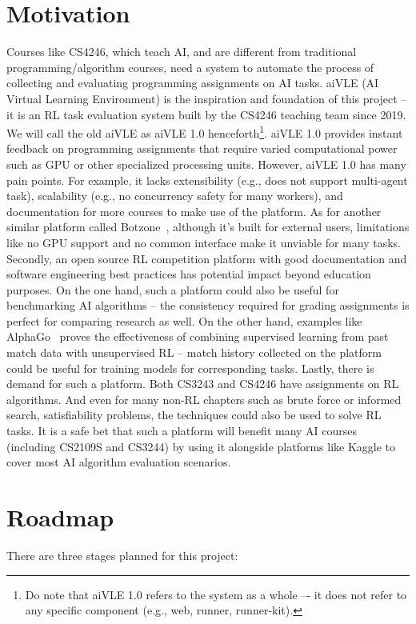 \documentclass[fyp]{socreport}
\begin{document}
\section{Motivation}
Courses like CS4246, which teach AI, and are different from traditional programming/algorithm courses, need a system to automate the process of collecting and evaluating programming assignments on AI tasks. aiVLE (AI Virtual Learning Environment) is the inspiration and foundation of this project – it is an RL task evaluation system built by the CS4246 teaching team since 2019. We will call the old aiVLE as aiVLE 1.0 henceforth\footnote{Do note that aiVLE 1.0 refers to the system as a whole –- it does not refer to any specific component (e.g., web, runner, runner-kit).}. aiVLE 1.0 provides instant feedback on programming assignments that require varied computational power such as GPU or other specialized processing units. However, aiVLE 1.0 has many pain points. For example, it lacks extensibility (e.g., does not support multi-agent task), scalability (e.g., no concurrency safety for many workers), and documentation for more courses to make use of the platform. As for another similar platform called Botzone~\cite{botzone}, although it’s built for external users, limitations like no GPU support and no common interface make it unviable for many tasks.
Secondly, an open source RL competition platform with good documentation and software engineering best practices has potential impact beyond education purposes. On the one hand, such a platform could also be useful for benchmarking AI algorithms – the consistency required for grading assignments is perfect for comparing research as well. On the other hand, examples like AlphaGo~\cite{alphago} proves the effectiveness of combining supervised learning from past match data with unsupervised RL – match history collected on the platform could be useful for training models for corresponding tasks. 
Lastly, there is demand for such a platform. Both CS3243 and CS4246 have assignments on RL algorithms. And even for many non-RL chapters such as brute force or informed search, satisfiability problems, the techniques could also be used to solve RL tasks. It is a safe bet that such a platform will benefit many AI courses (including CS2109S and CS3244) by using it alongside platforms like Kaggle to cover most AI algorithm evaluation scenarios.

\section{Roadmap}
There are three stages planned for this project:
\end{document}
